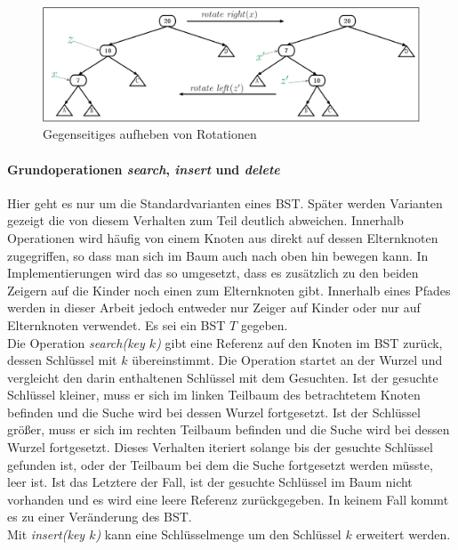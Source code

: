 \documentclass[a4paper,12pt]{article}
\begin{document}
\begin{figure}[h]
	\centering
	\includegraphics[width= 1.2\textwidth]{"Medien/Einleitung/LinksRechtsRotation"}
	\caption{Gegenseitiges aufheben von Rotationen}
	\label{fig:LinksRechtsRotation}
\end{figure}

\paragraph{Grundoperationen \textit{search}, \textit{insert} und \textit{delete}} \label{BST Operationen}
Hier geht es nur um die Standardvarianten eines BST. Später werden Varianten gezeigt die von diesem Verhalten zum Teil deutlich abweichen. Innerhalb Operationen wird häufig von einem Knoten aus direkt
auf dessen Elternknoten zugegriffen, so dass man sich im Baum auch nach oben hin bewegen kann. In Implementierungen wird das so umgesetzt, dass es zusätzlich zu den beiden Zeigern auf die Kinder noch einen zum Elternknoten gibt.  Innerhalb eines Pfades werden in dieser Arbeit jedoch entweder nur Zeiger auf Kinder oder nur auf Elternknoten verwendet. Es sei ein BST $T$ gegeben. \\
Die Operation \textit{search(key $k$)} gibt eine Referenz auf den Knoten im BST zurück, dessen Schlüssel mit $k$ übereinstimmt. Die Operation startet an der Wurzel und vergleicht den darin enthaltenen Schlüssel mit dem Gesuchten. Ist der gesuchte Schlüssel kleiner, muss er sich im linken Teilbaum des betrachtetem Knoten befinden und die Suche wird bei dessen Wurzel fortgesetzt. Ist der Schlüssel größer, muss er sich im rechten Teilbaum befinden und die Suche wird bei dessen Wurzel fortgesetzt. Dieses Verhalten iteriert solange bis der gesuchte Schlüssel gefunden ist, oder der Teilbaum bei dem die Suche fortgesetzt werden müsste, leer ist. Ist das Letztere der Fall, ist der gesuchte Schlüssel im Baum nicht vorhanden und es wird eine leere Referenz zurückgegeben. In keinem Fall kommt es zu einer Veränderung des BST.\\
Mit \textit{insert(key $k$)}  kann eine Schlüsselmenge um den Schlüssel $k$ erweitert werden. 
\end{document}
